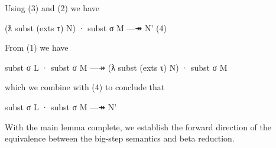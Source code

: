 \begin{itemize}
  Using (3) and (2) we have

  \begin{myDisplay}
    (ƛ subst (exts τ) N) · subst σ M —↠ N'                             (4)
  \end{myDisplay}

  From (1) we have

  \begin{myDisplay}
    subst σ L · subst σ M —↠ (ƛ subst (exts τ) N) · subst σ M
  \end{myDisplay}

  which we combine with (4) to conclude that

  \begin{myDisplay}
    subst σ L · subst σ M —↠ N'
  \end{myDisplay}
\end{itemize}

With the main lemma complete, we establish the forward direction of the
equivalence between the big-step semantics and beta reduction.

